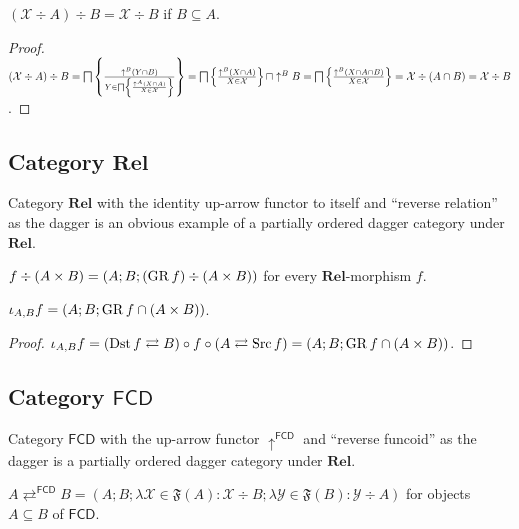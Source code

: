 \begin{prop}
  $(\mathcal{X} \div A) \div B = \mathcal{X} \div B$ if $B \subseteq A$.
\end{prop}

\begin{proof}
  $(\mathcal{X} \div A) \div B = \bigsqcap \left\{ \frac{ \uparrow^B  (Y \cap B)
  }{ Y \in \bigsqcap \left\{ \frac{ \uparrow^A  (X \cap A)}{X \in \mathcal{X} }\right\} \mathcal{} }\right\} =
  \bigsqcap \left\{ \frac{ \uparrow^B  (X \cap A) }{ X \in
  \mathcal{X} }\right\} \sqcap \uparrow^B B = \bigsqcap \left\{ \frac{ \uparrow^B  (X
  \cap A \cap B) }{ X \in \mathcal{X} }\right\} =
  \mathcal{X} \div (A \cap B) = \mathcal{X} \div B$.
\end{proof}

\subsection{\texorpdfstring{Category $\mathbf{Rel}$}{Category Rel}}

Category $\mathbf{Rel}$ with the identity up-arrow functor to itself
and ``reverse relation'' as the dagger is an obvious example of a partially
ordered dagger category under $\mathbf{Rel}$.

\begin{defn}
  $f \div (A \times B) = (A ; B ; (\operatorname{GR} f) \div (A \times B))$ for every
  $\mathbf{Rel}$-morphism $f$.
\end{defn}

\begin{prop}
  $\iota_{A, B} f = (A ; B ; \operatorname{GR} f \cap (A \times B))$.
\end{prop}

\begin{proof}
  $\iota_{A, B} f = (\operatorname{Dst} f \rightleftarrows B) \circ f \circ (A
  \rightleftarrows \operatorname{Src} f) = (A ; B ; \operatorname{GR} f \cap (A \times B))$.
\end{proof}

\subsection{\texorpdfstring{Category $\mathsf{FCD}$}{Category FCD}}

Category $\mathsf{FCD}$ with the up-arrow functor
$\uparrow^{\mathsf{FCD}}$ and ``reverse funcoid'' as the dagger is a
partially ordered dagger category under $\mathbf{Rel}$.

\begin{prop}
  $A \rightleftarrows^{\mathsf{FCD}} B = (A ; B ; \lambda \mathcal{X}
  \in \mathfrak{F} (A) : \mathcal{X} \div B ; \lambda \mathcal{Y} \in
  \mathfrak{F} (B) : \mathcal{Y} \div A)$ for objects $A \subseteq B$ of
  $\mathsf{FCD}$.
\end{prop}

